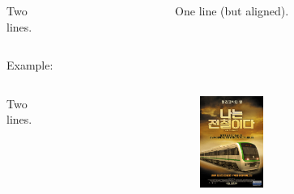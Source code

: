 \documentclass{beamer}
\begin{document}
\begin{columns}[t] 
\begin{column}{5cm} 
Two\\lines. 
\end{column} 
\begin{column}{5cm} 
One line (but aligned). 
\end{column} 
\end{columns} 
Example: 
\begin{columns}[t] 
\begin{column}{5cm} 
Two\\lines. 
\end{column}
\begin{column}[T]{5cm} 
\includegraphics[height=3cm]{abcd.jpg} 
\end{column} 
\end{columns} 
\end{document}

